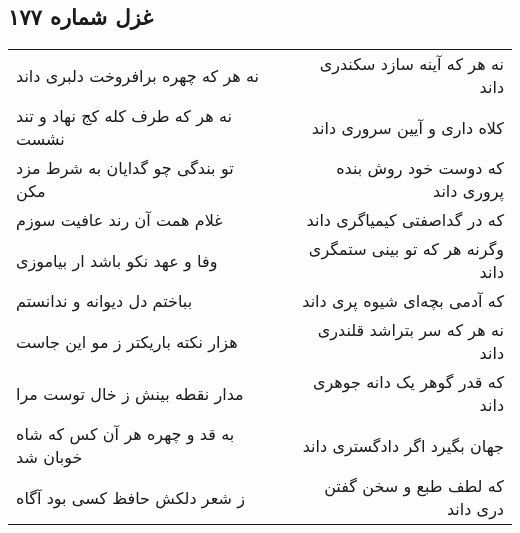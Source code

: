 \begin{center}
\section*{غزل شماره ۱۷۷}
\label{sec:sh177}
\begin{longtable}{l p{0.5cm} r}
نه هر که چهره برافروخت دلبری داند
&&
نه هر که آینه سازد سکندری داند
\\
نه هر که طرف کله کج نهاد و تند نشست
&&
کلاه داری و آیین سروری داند
\\
تو بندگی چو گدایان به شرط مزد مکن
&&
که دوست خود روش بنده پروری داند
\\
غلام همت آن رند عافیت سوزم
&&
که در گداصفتی کیمیاگری داند
\\
وفا و عهد نکو باشد ار بیاموزی
&&
وگرنه هر که تو بینی ستمگری داند
\\
بباختم دل دیوانه و ندانستم
&&
که آدمی بچه‌ای شیوه پری داند
\\
هزار نکته باریکتر ز مو این جاست
&&
نه هر که سر بتراشد قلندری داند
\\
مدار نقطه بینش ز خال توست مرا
&&
که قدر گوهر یک دانه جوهری داند
\\
به قد و چهره هر آن کس که شاه خوبان شد
&&
جهان بگیرد اگر دادگستری داند
\\
ز شعر دلکش حافظ کسی بود آگاه
&&
که لطف طبع و سخن گفتن دری داند
\\
\end{longtable}
\end{center}
